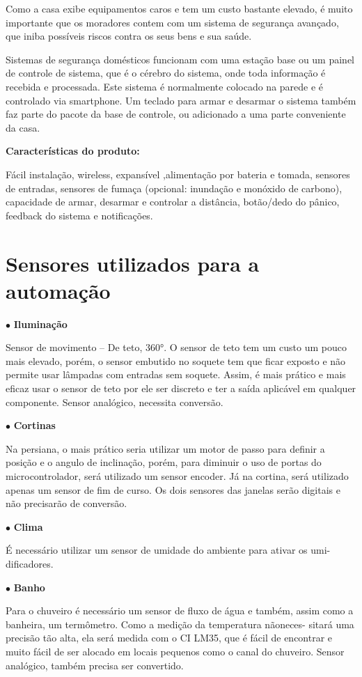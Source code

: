 	Como a casa exibe equipamentos caros e tem um custo bastante elevado, é muito importante que os moradores contem com um sistema de segurança avançado, que iniba possíveis riscos contra os seus bens e sua saúde.

	Sistemas de segurança domésticos funcionam com uma estação base ou um painel de controle de sistema, que é o cérebro do sistema, onde toda informação é recebida e processada. Este sistema é normalmente colocado na parede e é controlado via smartphone. Um teclado para armar e desarmar o sistema também faz parte do pacote da base de controle, ou adicionado a uma parte conveniente da casa.

\textbf{Características do produto:}

	Fácil instalação, wireless, expansível ,alimentação por bateria e tomada, sensores de entradas, sensores de fumaça (opcional: inundação e monóxido de carbono), capacidade de armar, desarmar e controlar a distância, botão/dedo do pânico, feedback do sistema e notificações.


\section{Sensores utilizados para a automação}

$\bullet$ \textbf{Iluminação}

	Sensor de movimento – De teto, 360°. O sensor de teto tem um custo um pouco mais elevado, porém, o sensor embutido no soquete tem que ficar exposto e não permite usar lâmpadas com entradas sem soquete. Assim, é mais prático e mais eficaz usar o sensor de teto por ele ser discreto e ter a saída aplicável em qualquer componente. Sensor analógico, necessita conversão.

$\bullet$ \textbf{Cortinas}

	Na persiana, o mais prático seria utilizar um motor de passo para definir a posição e o angulo de inclinação, porém, para diminuir o uso de portas do microcontrolador, será utilizado um sensor encoder. Já na cortina, será utilizado apenas um sensor de fim de curso. Os dois sensores das janelas serão digitais e não precisarão de conversão.

$\bullet$ \textbf{Clima}

	É necessário utilizar um sensor de umidade do ambiente para ativar os umi- dificadores.
	
$\bullet$ \textbf{Banho}

	Para o chuveiro é necessário um sensor de fluxo de água e também, assim como a banheira, um termômetro. Como a medição da temperatura nãoneces- sitará uma precisão tão alta, ela será medida com o CI LM35, que é fácil de encontrar e muito fácil de ser alocado em locais pequenos como o canal do chuveiro. Sensor analógico, também precisa ser convertido.

